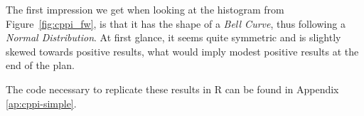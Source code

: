 The first impression we get when looking at the histogram from Figure~\ref{fig:cppi_fw}, is that it has the shape of a \textit{Bell Curve}, thus following a \textit{Normal Distribution}. At first glance, it seems quite symmetric and is slightly skewed towards positive results, what would imply modest positive results at the end of the plan.


The code necessary to replicate these results in R can be found in Appendix \ref{ap:cppi-simple}.
